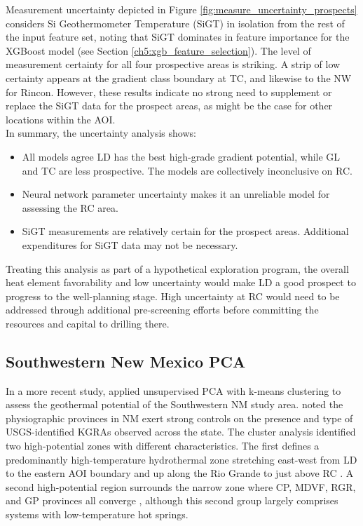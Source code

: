 Measurement uncertainty depicted in Figure \ref{fig:measure_uncertainty_prospects} considers Si Geothermometer Temperature (SiGT) in isolation from the rest of the input feature set, noting that SiGT dominates in feature importance for the XGBoost model (see Section \ref{ch5:xgb_feature_selection}). The level of measurement certainty for all four prospective areas is striking. A strip of low certainty appears at the gradient class boundary at TC, and likewise to the NW for Rincon. However, these results indicate no strong need to supplement or replace the SiGT data for the prospect areas, as might be the case for other locations within the AOI.
\\
In summary, the uncertainty analysis shows:
\begin{itemize}[itemsep=2pt]
    \item All models agree LD has the best high-grade gradient potential, while GL and TC are less prospective. The models are collectively inconclusive on RC.
    \item Neural network parameter uncertainty makes it an unreliable model for assessing the RC area.
    \item SiGT measurements are relatively certain for the prospect areas. Additional expenditures for SiGT data may not be necessary.
\end{itemize}
Treating this analysis as part of a hypothetical exploration program, the overall heat element favorability and low uncertainty would make LD a good prospect to progress to the well-planning stage. High uncertainty at RC would need to be addressed through additional pre-screening efforts before committing the resources and capital to drilling there.

\subsection{Southwestern New Mexico PCA}\label{ch5:case_nm_pca}
In a more recent study, \citet{pepin_new_2019} applied unsupervised PCA with k-means clustering to assess the geothermal potential of the Southwestern NM study area. \citeauthor{pepin_new_2019} noted the physiographic provinces in NM exert strong controls on the presence and type of USGS-identified KGRAs observed across the state. The cluster analysis identified two high-potential zones with different characteristics. The first defines a predominantly high-temperature hydrothermal zone stretching east-west from LD to the eastern AOI boundary and up along the Rio Grande to just above RC \citep[Figure 3.5A,][]{pepin_new_2019}. A second high-potential region surrounds the narrow zone where CP, MDVF, RGR, and GP provinces all converge \citep[Figure 3.5C,][]{pepin_new_2019}, although this second group largely comprises systems with low-temperature hot springs. 

